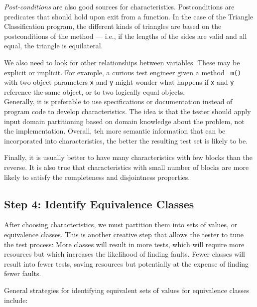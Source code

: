 {\it Post-conditions} are also good sources for characteristics. Postconditions
are predicates that should hold upon exit from a function. In the case of the
Triangle Classification program, the different kinds of triangles are based on
the postconditions of the method --- i.e., if the lengths of the sides are valid
and all equal, the triangle is equilateral. 

We also need to look for other relationships between variables. These may be
explicit or implicit. For example, a curious test engineer given a method {\tt
m()} with two object parameters {\tt x} and {\tt y} might wonder what happens if
{\tt x} and {\tt y} reference the same object, or to two logically equal
objects.
~\\

Generally, it is preferable to use specifications or documentation instead of
program code to develop characteristics. The idea is that the tester should
apply input domain partitioning based on domain knowledge about the problem, not
the implementation. Overall, teh more semantic information that can be
incorporated into characteristics, the better the resulting test set is likely
to be.

Finally, it is usually better to have many characteristics with few blocks than
the reverse. It is also true that characteristics with small number of blocks
are more likely to satisfy the completeness and disjointness properties. 

\subsection*{Step 4: Identify Equivalence Classes}

After choosing characteristics, we must partition them into sets of values, or
equivalence classes. This is another creative step that allows the tester to
tune the test process: More classes will result in more tests, which will
require more resources but which increases the likelihood of finding faults.
Fewer classes will result into fewer tests, saving resources but potentially at
the expense of finding fewer faults. 

General strategies for identifying equivalent sets of values for equivalence
classes include:

